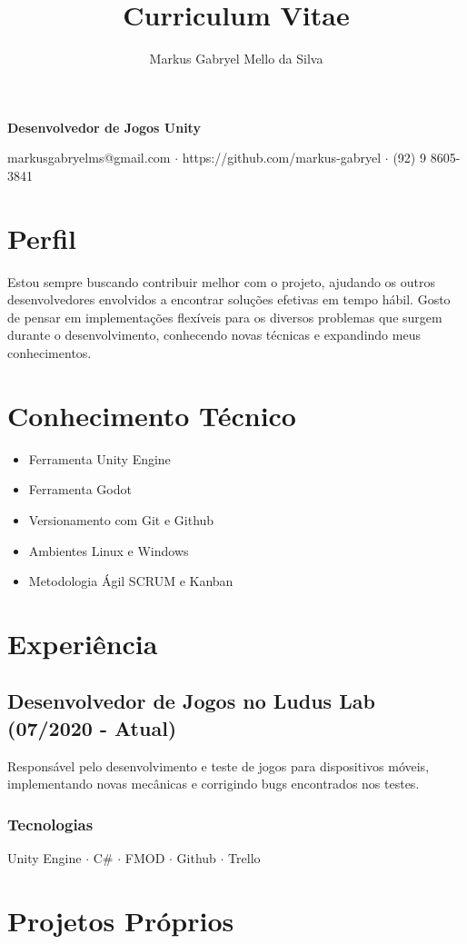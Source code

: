 \documentclass{article}
\makeatletter
\renewcommand{\maketitle}{
	\begin{center}
		{\huge\bfseries \theauthor}
		\vspace{.25em}

		{\large\bfseries Desenvolvedor de Jogos Unity}
		\vspace{.25em}

		markusgabryelms@gmail.com $\cdot$
		https://github.com/markus-gabryel $\cdot$
		(92) 9 8605-3841

	\end{center}
}
\makeatother
\begin{document}
\title{Curriculum Vitae}
\author{Markus Gabryel Mello da Silva}
\maketitle

\section{Perfil}
Estou sempre buscando contribuir melhor com o projeto, ajudando os outros
desenvolvedores envolvidos a encontrar soluções efetivas em tempo hábil. Gosto
de pensar em implementações flexíveis para os diversos problemas que surgem
durante o desenvolvimento, conhecendo novas técnicas e expandindo meus
conhecimentos.  

\section{Conhecimento Técnico}
\begin{itemize}
	\item Ferramenta Unity Engine
	\item Ferramenta Godot
	\item Versionamento com Git e Github
	\item Ambientes Linux e Windows
	\item Metodologia Ágil SCRUM e Kanban
\end{itemize}

\section{Experiência}

\subsection{Desenvolvedor de Jogos no Ludus Lab (07/2020 -  Atual)}
Responsável pelo desenvolvimento e teste de jogos para dispositivos móveis,
implementando novas mecânicas e corrigindo bugs encontrados nos testes.

\subsubsection{Tecnologias}
Unity Engine $\cdot$
C{\#} $\cdot$
FMOD $\cdot$
Github $\cdot$
Trello

\section{Projetos Próprios}
\end{document}
